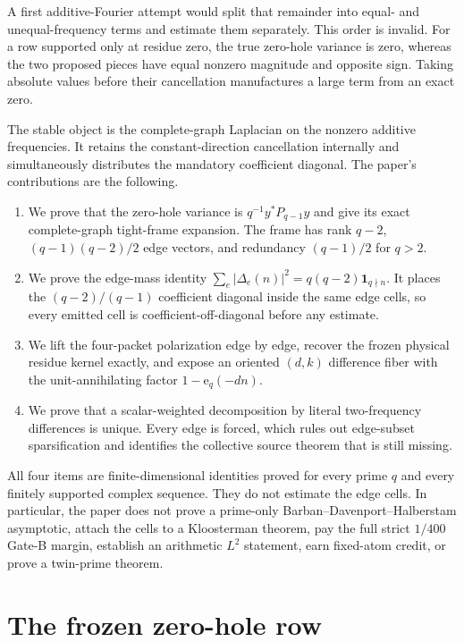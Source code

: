 \documentclass[11pt]{article}
\newcommand{\e}{\mathrm e}
\begin{document}
A first additive-Fourier attempt would split that remainder into equal- and
unequal-frequency terms and estimate them separately.  This order is invalid.
For a row supported only at residue zero, the true zero-hole variance is zero,
whereas the two proposed pieces have equal nonzero magnitude and opposite
sign.  Taking absolute values before their cancellation manufactures a large
term from an exact zero.

The stable object is the complete-graph Laplacian on the nonzero additive
frequencies.  It retains the constant-direction cancellation internally and
simultaneously distributes the mandatory coefficient diagonal.  The paper's
contributions are the following.

\begin{enumerate}[leftmargin=2.2em]
  \item We prove that the zero-hole variance is $q^{-1}y^*P_{q-1}y$ and give
  its exact complete-graph tight-frame expansion.  The frame has rank $q-2$,
  $(q-1)(q-2)/2$ edge vectors, and redundancy $(q-1)/2$ for $q>2$.
  \item We prove the edge-mass identity
  $\sum_e|\Delta_e(n)|^2=q(q-2)\mathbf 1_{q\nmid n}$.  It places the
  $(q-2)/(q-1)$ coefficient diagonal inside the same edge cells, so every
  emitted cell is coefficient-off-diagonal before any estimate.
  \item We lift the four-packet polarization edge by edge, recover the frozen
  physical residue kernel exactly, and expose an oriented $(d,k)$ difference
  fiber with the unit-annihilating factor $1-\e_q(-dn)$.
  \item We prove that a scalar-weighted decomposition by literal
  two-frequency differences is unique.  Every edge is forced, which rules out
  edge-subset sparsification and identifies the collective source theorem
  that is still missing.
\end{enumerate}

All four items are finite-dimensional identities proved for every prime
$q$ and every finitely supported complex sequence.  They do not estimate the
edge cells.  In particular, the paper does not prove a prime-only
Barban--Davenport--Halberstam asymptotic, attach the cells to a Kloosterman
theorem, pay the full strict $1/400$ Gate-B margin, establish an arithmetic
$L^2$ statement, earn fixed-atom credit, or prove a twin-prime theorem.

\section{The frozen zero-hole row}
\end{document}
